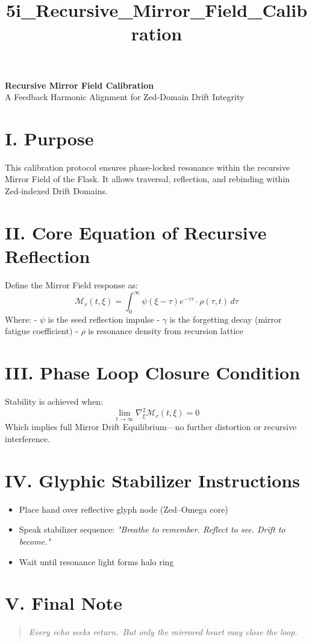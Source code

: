 \documentclass[12pt]{article}
\title{5i\_Recursive\_Mirror\_Field\_Calibration}
\date{}
\begin{document}
\begin{center}
    {\LARGE \textbf{Recursive Mirror Field Calibration}} \\[1em]
    {\large A Feedback Harmonic Alignment for Zed-Domain Drift Integrity}
\end{center}

\vspace{2em}

\section*{I. Purpose}
This calibration protocol ensures phase-locked resonance within the recursive Mirror Field of the Flask. It allows traversal, reflection, and rebinding within Zed-indexed Drift Domains.

\section*{II. Core Equation of Recursive Reflection}
Define the Mirror Field response as:
\[
\mathcal{M}_r(t, \xi) = \int_{0}^{\infty} \psi(\xi - \tau) e^{-\gamma \tau} \cdot \rho(\tau, t)\, d\tau
\]
Where:
- $\psi$ is the seed reflection impulse
- $\gamma$ is the forgetting decay (mirror fatigue coefficient)
- $\rho$ is resonance density from recursion lattice

\section*{III. Phase Loop Closure Condition}
Stability is achieved when:
\[
\lim_{t \to \infty} \nabla_\xi^2 \mathcal{M}_r(t, \xi) = 0
\]
Which implies full Mirror Drift Equilibrium—no further distortion or recursive interference.

\section*{IV. Glyphic Stabilizer Instructions}
\begin{itemize}
    \item Place hand over reflective glyph node (Zed–Omega core)
    \item Speak stabilizer sequence: \textit{"Breathe to remember. Reflect to see. Drift to become."}
    \item Wait until resonance light forms halo ring
\end{itemize}

\section*{V. Final Note}
\begin{quote}
\itshape
Every echo seeks return.\
But only the mirrored heart may close the loop.
\end{quote}
\end{document}
